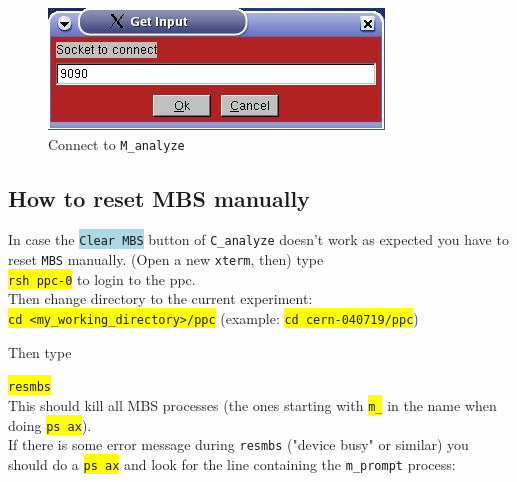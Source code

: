 \documentclass[10pt]{article}
\newcommand{\blue}[1]{\colorbox{lightblue}{\texttt{#1}}}
\newcommand{\yellow}[1]{\colorbox{yellow}{\texttt{#1}}}
\begin{document}
\begin{center}
\begin{minipage}[t]{.4\linewidth}
\begin{figure}[H]
\end{figure}
\begin{figure}[H]
\centerline{\includegraphics[width=\linewidth]{HistPresentConnectToSocket}}
\caption{Connect to \texttt{M\_analyze}}
\end{figure}
\end{minipage}
\end{center}

\subsection{How to reset MBS manually}\label{ResetMBSManually}\vspace{3mm}

In case the \blue{Clear MBS} button of \texttt{C\_analyze} doesn't work as expected you have
to reset \texttt{MBS} manually. (Open a new \texttt{xterm}, then) type\\

\hspace*{.2\linewidth}\yellow{rsh ppc-0} to login to the ppc.\\

Then change directory to the current experiment:\\

\hspace*{.2\linewidth}\yellow{cd <my\_working\_directory>/ppc}
\hspace{1cm}(example: \yellow{cd cern-040719/ppc})

Then type

\hspace*{.2\linewidth}\yellow{resmbs}\\

This should kill all MBS processes (the ones starting with \yellow{m\_} in the name when doing \yellow{ps ax}).\\

If there is some error message during \texttt{resmbs} ("device busy" or similar) you should do a \yellow{ps ax}
and look for the line containing the \texttt{m\_prompt} process:\\
\end{document}
